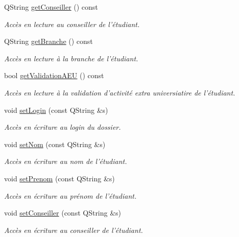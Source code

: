 \begin{DoxyCompactItemize}
Q\-String \hyperlink{class_dossier_ab40652445c64094021520d1e14ddbd71}{get\-Conseiller} () const 
\begin{DoxyCompactList}\small\item\em Accès en lecture au conseiller de l'étudiant. \end{DoxyCompactList}\item 
Q\-String \hyperlink{class_dossier_a0fab522247cd17b1dcd3d7dbcb250bd5}{get\-Branche} () const 
\begin{DoxyCompactList}\small\item\em Accès en lecture à la branche de l'étudiant. \end{DoxyCompactList}\item 
bool \hyperlink{class_dossier_acd5dd169bf306eef92b8f56933f4e5c3}{get\-Validation\-A\-E\-U} () const 
\begin{DoxyCompactList}\small\item\em Accès en lecture à la validation d'activité extra universiatire de l'étudiant. \end{DoxyCompactList}\item 
void \hyperlink{class_dossier_af0977386c8ccd466aa799204a359fdeb}{set\-Login} (const Q\-String \&s)
\begin{DoxyCompactList}\small\item\em Accès en écriture au login du dossier. \end{DoxyCompactList}\item 
void \hyperlink{class_dossier_a917390a59f17ed04e4abce7ef658774c}{set\-Nom} (const Q\-String \&s)
\begin{DoxyCompactList}\small\item\em Accès en écriture au nom de l'étudiant. \end{DoxyCompactList}\item 
void \hyperlink{class_dossier_a3cb417ca1c4f1858d1240e5ab07bfa56}{set\-Prenom} (const Q\-String \&s)
\begin{DoxyCompactList}\small\item\em Accès en écriture au prénom de l'étudiant. \end{DoxyCompactList}\item 
void \hyperlink{class_dossier_a44a2f33a01787922e6604fe7e14de1e2}{set\-Conseiller} (const Q\-String \&s)
\begin{DoxyCompactList}\small\item\em Accès en écriture au conseiller de l'étudiant. \end{DoxyCompactList}\item 

\end{DoxyCompactItemize}
